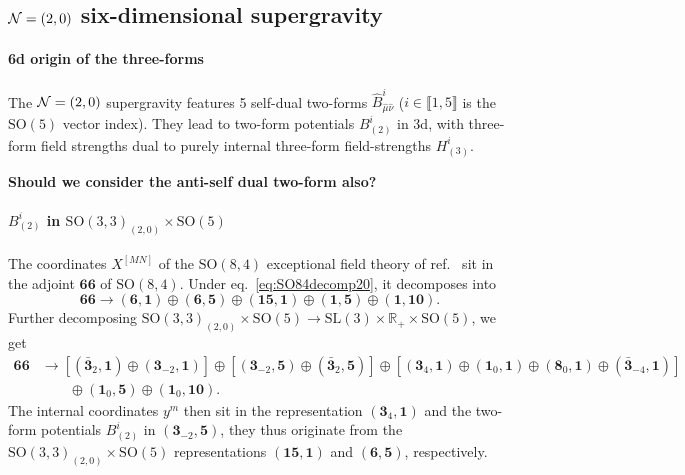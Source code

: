 \documentclass[11pt]{article}
\newcommand{\SO}{\ensuremath{\mathrm{SO}}\xspace}
\newcommand{\SL}{\ensuremath{\mathrm{SL}}\xspace}
\newcommand{\R}{\ensuremath{\mathbb{R}}\xspace}
\newcommand{\ce}[1]{\marginpar{\parbox{\marginparwidth}{\boldmath $\Longleftarrow$}}
{\boldmath\bfseries #1}}
\begin{document}
  \subsection{\texorpdfstring{${\cal N}=(2,0)$}{N=(2,0)} six-dimensional supergravity}

  \paragraph{6d origin of the three-forms} The ${\cal N}=(2,0)$ supergravity features 5 self-dual two-forms $\hat{B}_{\hat\mu\hat\nu}^{i}$ ($i\in\llbracket1,5\rrbracket$ is the $\SO(5)$ vector index). They lead to two-form potentials $B_{(2)}^{i}$ in 3d, with three-form field strengths dual to purely internal three-form field-strengths $H_{(3)}^{i}$.

  \ce{Should we consider the anti-self dual two-form also?}

  \paragraph{\boldmath $B_{(2)}^{i}$ in $\SO(3,3)_{(2,0)}\times\SO(5)$}
  The coordinates $X^{[MN]}$ of the $\SO(8,4)$ exceptional field theory of ref.~\cite{Hohm:2017wtr} sit in the adjoint $\bm{66}$ of $\SO(8,4)$. Under eq.~\eqref{eq:SO84decomp20}, it decomposes into
  \begin{equation}  
    \bm{66} \longrightarrow (\bm{6},\bm{1}) \oplus (\bm{6},\bm{5}) \oplus (\bm{15},\bm{1}) \oplus (\bm{1},\bm{5}) \oplus (\bm{1},\bm{10}).
  \end{equation}
  Further decomposing $\SO(3,3)_{(2,0)}\times\SO(5)\rightarrow\SL(3)\times\R_{+}\times\SO(5)$, we get
  \begin{equation}
    \begin{aligned}
      \bm{66} &\longrightarrow [(\bm{\bar{3}}_{2},\bm{1})\oplus(\bm{3}_{-2},\bm{1})] \oplus [(\bm{3}_{-2},\bm{5})\oplus(\bm{\bar{3}}_{2},\bm{5})] \oplus [(\bm{3}_{4},\bm{1})\oplus(\bm{1}_{0},\bm{1})\oplus(\bm{8}_{0},\bm{1})\oplus(\bm{\bar{3}}_{-4},\bm{1})] \\
      & \qquad \oplus (\bm{1}_{0},\bm{5}) \oplus (\bm{1}_{0},\bm{10}).
    \end{aligned}
  \end{equation}
  The internal coordinates $y^{m}$ then sit in the representation $(\bm{3}_{4},\bm{1})$ and the two-form potentials $B_{(2)}^{i}$ in $(\bm{3}_{-2},\bm{5})$, they thus originate from the $\SO(3,3)_{(2,0)}\times\SO(5)$ representations $(\bm{15},\bm{1})$ and $(\bm{6},\bm{5})$, respectively.
\end{document}

